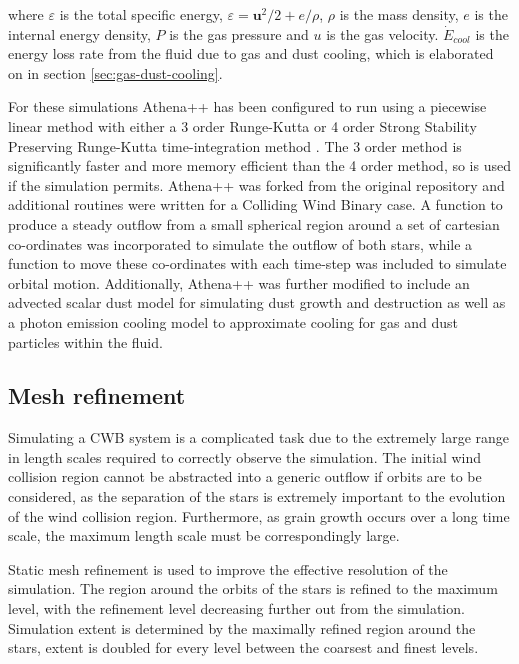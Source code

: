 where $\varepsilon$ is the total specific energy, $\varepsilon = \boldsymbol{u}^2/2 + e/\rho $, $\rho$ is the mass density, $e$ is the internal energy density, $P$ is the gas pressure and $u$ is the gas velocity. $\dot E_{cool}$ is the energy loss rate from the fluid due to gas and dust cooling, which is elaborated on in section \ref{sec:gas-dust-cooling}.


For these simulations Athena++ has been configured to run using a piecewise linear method with either a 3 order Runge-Kutta or 4 order Strong Stability Preserving Runge-Kutta time-integration method \parencite{spiteriNewClassOptimal2002}. The 3 order method is significantly faster and more memory efficient than the 4 order method, so is used if the simulation permits. Athena++ was forked from the original repository and additional routines were written for a Colliding Wind Binary case. A function to produce a steady outflow from a small spherical region around a set of cartesian co-ordinates was incorporated to simulate the outflow of both stars, while a function to move these co-ordinates with each time-step was included to simulate orbital motion. Additionally, Athena++ was further modified to include an advected scalar dust model for simulating dust growth and destruction as well as a photon emission cooling model to approximate cooling for gas and dust particles within the fluid.

\subsection{Mesh refinement}


Simulating a CWB system is a complicated task due to the extremely large range in length scales required to correctly observe the simulation. The initial wind collision region cannot be abstracted into a generic outflow if orbits are to be considered, as the separation of the stars is extremely important to the evolution of the wind collision region. Furthermore, as grain growth occurs over a long time scale, the maximum length scale must be correspondingly large. 

Static mesh refinement is used to improve the effective resolution of the simulation. The region around the orbits of the stars is refined to the maximum level, with the refinement level decreasing further out from the simulation. Simulation extent is determined by the maximally refined region around the stars, extent is doubled for every level between the coarsest and finest levels.


